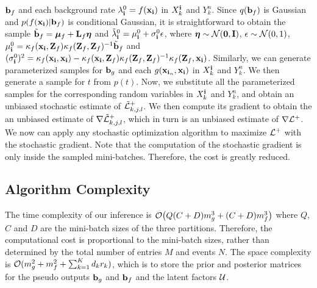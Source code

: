  ${\bf b}_f$ and each background rate $\lambda_{{\bf i}}^0 = f({\bf x}_{\bf i})$ in $X_k^{{\bf i}}$ and $Y_k^n$. Since $q({\bf b}_f)$ is Gaussian and $p(f({\bf x}_{\bf i})|{\bf b}_f)$ is conditional Gaussian, it is straightforward to obtain the sample $\tilde{{\bf b}}_f = \boldsymbol{\mu}_f + {\bf L}_f \boldsymbol{\eta}$ and $\tilde{\lambda}_{{\bf i}}^0 = \mu_{{\bf i}}^0 + \sigma_{{\bf i}}^0\epsilon$, where $\boldsymbol{\eta} \sim \mathcal{N}({\bf 0}, {\bf I})$, $\epsilon \sim \mathcal{N}(0, 1)$, $\mu_{{\bf i}}^0 = \kappa_f({\bf x}_{{\bf i}}, {\bf Z}_f)\kappa_f({\bf Z}_f, {\bf Z}_f)^{-1}\tilde{{\bf b}}_f$ and $(\sigma_{{\bf i}}^0)^2 = \kappa_f({\bf x}_{{\bf i}}, {\bf x}_{{\bf i}}) - \kappa_f({\bf x}_{{\bf i}}, {\bf Z}_f)\kappa_f({\bf Z}_f, {\bf Z}_f)^{-1}\kappa_f({\bf Z}_f, {\bf x}_{{\bf i}})$. Similarly, we can generate parameterized samples for ${\bf b}_g$ and each $g({\bf x}_{{\bf i}_n}, {\bf x}_{{\bf i}})$ in $X_k^{{\bf i}}$ and $Y_k^n$. We then generate a sample for $t$ from $p(t)$. Now, we substitute all the parameterized samples for the corresponding random variables in $X_k^{{\bf i}}$ and $Y_k^n$, and obtain an unbiased stochastic estimate of $\tilde{\mathcal{L}}^+_{k,j,l}$. We then compute its gradient to obtain the an unbiased estimate of $\nabla \tilde{\mathcal{L}}^+_{k,j,l}$, which in turn is an unbiased estimate of $\nabla \mathcal{L}^+$. We now can apply any stochastic optimization algorithm to maximize $\mathcal{L}^+$ with the stochastic gradient. Note that the computation of the stochastic gradient is only inside the sampled mini-batches. Therefore, the cost is greatly reduced.  
\vspace{-0.1in}
\subsection{Algorithm Complexity}
\vspace{-0.05in}
The time complexity of our inference is $\mathcal{O}\big( Q(C + D)m_g^3 + (C+D)m_f^3\big)$ where $Q$, $C$ and $D$ are the mini-batch sizes of the three partitions. Therefore,  the computational cost is proportional to the mini-batch sizes, rather than determined by the total number of entries $M$ and events $N$. The space complexity is $\mathcal{O} (m_g^2 + m_f^2 + \sum_{k=1}^Kd_k r_k )$, which is to store the prior and posterior matrices for the pseudo outputs ${\bf b}_g$ and ${\bf b}_f$ and the latent factors ${\mathcal{U}}$. 